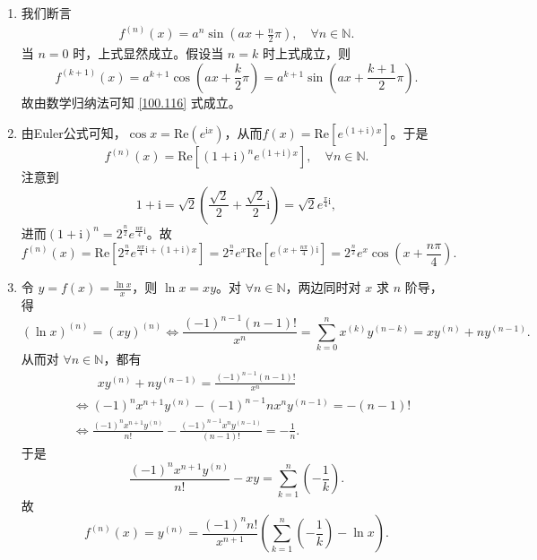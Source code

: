 \documentclass[../../main.tex]{subfiles}
\begin{document}
\begin{solution}
\begin{enumerate}[(1)]
\item 我们断言
\begin{align}\label{100.116}
f^{(n)}(x) = a^n \sin\left(ax + \frac{n}{2}\pi\right), \quad \forall n \in \mathbb{N}. 
\end{align}
当 \( n = 0 \) 时，上式显然成立。假设当 \( n = k \) 时上式成立，则
\[
f^{(k+1)}(x) = a^{k+1} \cos\left(ax + \frac{k}{2}\pi\right) = a^{k+1} \sin\left(ax + \frac{k+1}{2}\pi\right).
\]
故由数学归纳法可知 \eqref{100.116} 式成立。

\item 由Euler公式可知，\(\cos x = \mathrm{Re}(e^{\mathrm{i}x})\)，从而\(f(x) = \mathrm{Re}[e^{(1+\mathrm{i})x}]\)。于是
\[
f^{(n)}(x) = \mathrm{Re}[(1+\mathrm{i})^n e^{(1+\mathrm{i})x}], \quad \forall n \in \mathbb{N}.
\]
注意到
\[
1+\mathrm{i} = \sqrt{2}\left(\frac{\sqrt{2}}{2} + \frac{\sqrt{2}}{2}\mathrm{i}\right) = \sqrt{2}e^{\frac{\pi}{4}\mathrm{i}},
\]
进而\((1+\mathrm{i})^n = 2^{\frac{n}{2}}e^{\frac{n\pi}{4}\mathrm{i}}\)。故
\[
f^{(n)}(x) = \mathrm{Re}\left[2^{\frac{n}{2}}e^{\frac{n\pi}{4}\mathrm{i} + (1+\mathrm{i})x}\right] = 2^{\frac{n}{2}}e^x \mathrm{Re}\left[e^{\left(x + \frac{n\pi}{4}\right)\mathrm{i}}\right] = 2^{\frac{n}{2}}e^x \cos\left(x + \frac{n\pi}{4}\right).
\]

\item 令 \( y = f(x) = \frac{\ln x}{x} \)，则 \( \ln x = xy \)。对 \( \forall n \in \mathbb{N} \)，两边同时对 \( x \) 求 \( n \) 阶导，得
\[
(\ln x)^{(n)} = (xy)^{(n)} \Longleftrightarrow \frac{(-1)^{n - 1}(n - 1)!}{x^n} = \sum_{k=0}^{n} x^{(k)} y^{(n - k)} = xy^{(n)} + n y^{(n - 1)}.
\]
从而对 \( \forall n \in \mathbb{N} \)，都有
\begin{align*}
&\quad \quad xy^{\left( n \right)}+ny^{\left( n-1 \right)}=\frac{\left( -1 \right) ^{n-1}\left( n-1 \right) !}{x^n}
\\
&\Longleftrightarrow \left( -1 \right) ^nx^{n+1}y^{\left( n \right)}-\left( -1 \right) ^{n-1}nx^ny^{\left( n-1 \right)}=-\left( n-1 \right) !
\\
&\Longleftrightarrow \frac{\left( -1 \right) ^nx^{n+1}y^{\left( n \right)}}{n!}-\frac{\left( -1 \right) ^{n-1}x^ny^{\left( n-1 \right)}}{\left( n-1 \right) !}=-\frac{1}{n}.
\end{align*}
于是
\[
\frac{(-1)^n x^{n + 1} y^{(n)}}{n!} - xy = \sum_{k=1}^{n} \left( -\frac{1}{k} \right).
\]
故
\[
f^{(n)}(x) = y^{(n)} = \frac{(-1)^n n!}{x^{n + 1}} \left( \sum_{k=1}^{n} \left( -\frac{1}{k} \right) - \ln x \right).
\]


\end{enumerate}
\end{solution}
\end{document}
